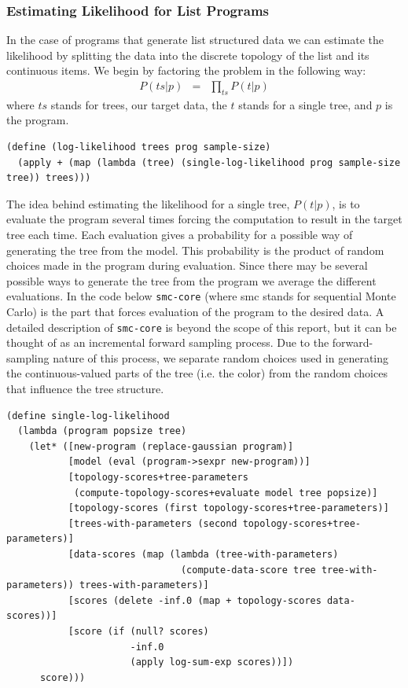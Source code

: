 \documentclass[a4paper,10pt]{article}
\begin{document}
\subsubsection{Estimating Likelihood for List Programs}
In the case of programs that generate list structured data we can estimate the likelihood by splitting the data into the discrete topology of the list and its continuous items.  We begin by factoring the problem in the following way:
\begin{eqnarray}
P(ts|p) &=& \prod_{ts}P(t|p)
\end{eqnarray}
where $ts$ stands for trees, our target data, the $t$ stands for a single tree, and $p$ is the program.
\begin{lstlisting}[frame=trBL]
(define (log-likelihood trees prog sample-size)
  (apply + (map (lambda (tree) (single-log-likelihood prog sample-size tree)) trees)))
\end{lstlisting}
The idea behind estimating the likelihood for a single tree, $P(t|p)$, is to evaluate the program several times forcing the computation to result in the target tree each time.  Each evaluation gives a probability for a possible way of generating the tree from the model.  This probability is the product of random choices made in the program during evaluation.  Since there may be several possible ways to generate the tree from the program we average the different evaluations.  In the code below \texttt{smc-core} (where smc stands for sequential Monte Carlo) is the part that forces evaluation of the program to the desired data.  A detailed description of \texttt{smc-core} is beyond the scope of this report, but it can be thought of as an incremental forward sampling process.  Due to the forward-sampling nature of this process, we separate random choices used in generating the continuous-valued parts of the tree (i.e. the color) from the random choices that influence the tree structure.
\begin{lstlisting}[frame=trBL]
(define single-log-likelihood 
  (lambda (program popsize tree)
    (let* ([new-program (replace-gaussian program)]
           [model (eval (program->sexpr new-program))]
           [topology-scores+tree-parameters 
            (compute-topology-scores+evaluate model tree popsize)]
           [topology-scores (first topology-scores+tree-parameters)]
           [trees-with-parameters (second topology-scores+tree-parameters)]
           [data-scores (map (lambda (tree-with-parameters) 
                               (compute-data-score tree tree-with-parameters)) trees-with-parameters)]
           [scores (delete -inf.0 (map + topology-scores data-scores))]
           [score (if (null? scores)
                      -inf.0
                      (apply log-sum-exp scores))])
      score)))
\end{lstlisting}
\end{document}
